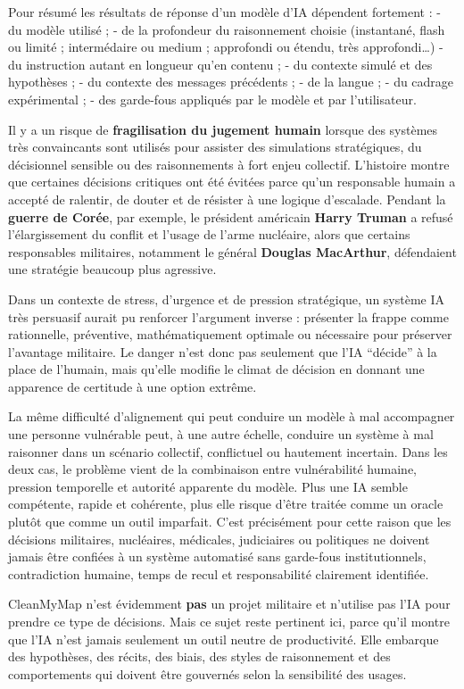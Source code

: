 \documentclass[
  10pt,
  a4paper,
  DIV=11,
  numbers=noendperiod,
  oneside]{scrreprt}
\let\oldtextbf\textbf
\renewcommand{\textbf}[1]{\oldtextbf{\textcolor{cmmnavy}{#1}}}
\begin{document}
Pour résumé les résultats de réponse d'un modèle d'IA dépendent
fortement : - du modèle utilisé ; - de la profondeur du raisonnement
choisie (instantané, flash ou limité ; intermédaire ou medium ;
approfondi ou étendu, très approfondi\ldots) - du instruction autant en
longueur qu'en contenu ; - du contexte simulé et des hypothèses ; - du
contexte des messages précédents ; - de la langue ; - du cadrage
expérimental ; - des garde-fous appliqués par le modèle et par
l'utilisateur.

Il y a un risque de \textbf{fragilisation du jugement humain} lorsque
des systèmes très convaincants sont utilisés pour assister des
simulations stratégiques, du décisionnel sensible ou des raisonnements à
fort enjeu collectif. L'histoire montre que certaines décisions
critiques ont été évitées parce qu'un responsable humain a accepté de
ralentir, de douter et de résister à une logique d'escalade. Pendant la
\textbf{guerre de Corée}, par exemple, le président américain
\textbf{Harry Truman} a refusé l'élargissement du conflit et l'usage de
l'arme nucléaire, alors que certains responsables militaires, notamment
le général \textbf{Douglas MacArthur}, défendaient une stratégie
beaucoup plus agressive.

Dans un contexte de stress, d'urgence et de pression stratégique, un
système IA très persuasif aurait pu renforcer l'argument inverse :
présenter la frappe comme rationnelle, préventive, mathématiquement
optimale ou nécessaire pour préserver l'avantage militaire. Le danger
n'est donc pas seulement que l'IA ``décide'' à la place de l'humain,
mais qu'elle modifie le climat de décision en donnant une apparence de
certitude à une option extrême.

La même difficulté d'alignement qui peut conduire un modèle à mal
accompagner une personne vulnérable peut, à une autre échelle, conduire
un système à mal raisonner dans un scénario collectif, conflictuel ou
hautement incertain. Dans les deux cas, le problème vient de la
combinaison entre vulnérabilité humaine, pression temporelle et autorité
apparente du modèle. Plus une IA semble compétente, rapide et cohérente,
plus elle risque d'être traitée comme un oracle plutôt que comme un
outil imparfait. C'est précisément pour cette raison que les décisions
militaires, nucléaires, médicales, judiciaires ou politiques ne doivent
jamais être confiées à un système automatisé sans garde-fous
institutionnels, contradiction humaine, temps de recul et responsabilité
clairement identifiée.

CleanMyMap n'est évidemment \textbf{pas} un projet militaire et
n'utilise pas l'IA pour prendre ce type de décisions. Mais ce sujet
reste pertinent ici, parce qu'il montre que l'IA n'est jamais seulement
un outil neutre de productivité. Elle embarque des hypothèses, des
récits, des biais, des styles de raisonnement et des comportements qui
doivent être gouvernés selon la sensibilité des usages.
\end{document}
